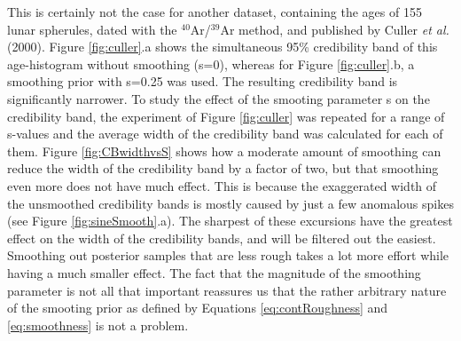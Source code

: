 \documentclass{article}
\begin{document}
This is  certainly not  the case for  another dataset,  containing the
ages  of  155  lunar  spherules, dated  with  the  $^{40}$Ar/$^{39}$Ar
method,  and  published  by  Culler  {\it  et  al.}   (2000).   Figure
\ref{fig:culler}.a  shows the  simultaneous 95\%  credibility  band of
this  age-histogram  without   smoothing  (s=0),  whereas  for  Figure
\ref{fig:culler}.b,  a  smoothing prior  with  s=0.25  was used.   The
resulting credibility  band is  significantly narrower.  To  study the
effect  of the  smooting  parameter  s on  the  credibility band,  the
experiment  of Figure  \ref{fig:culler} was  repeated for  a  range of
s-values and the average width  of the credibility band was calculated
for each  of them.  Figure  \ref{fig:CBwidthvsS} shows how  a moderate
amount of smoothing can reduce the  width of the credibility band by a
factor of two, but that smoothing even more does not have much effect.
This is  because the exaggerated  width of the  unsmoothed credibility
bands  is mostly caused  by just  a few  anomalous spikes  (see Figure
\ref{fig:sineSmooth}.a).   The sharpest of  these excursions  have the
greatest effect  on the  width of the  credibility bands, and  will be
filtered out  the easiest.  Smoothing  out posterior samples  that are
less rough takes a lot more effort while having a much smaller effect.
The fact that the magnitude of the smoothing parameter is not all that
important  reassures  us  that  the  rather arbitrary  nature  of  the
smooting  prior  as defined  by  Equations \ref{eq:contRoughness}  and
\ref{eq:smoothness} is not a problem.\\
\end{document}
